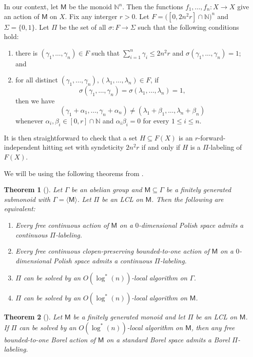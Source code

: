\documentclass[11pt, reqno, a4paper]{amsart}
\newtheorem{theorem}{Theorem}[section]
\theoremstyle{definition}
\theoremstyle{plain}
\begin{document}
In our context, let $\mathsf{M}$ be the monoid $\mathbb{N}^n$. Then the functions $f_1, \dots, f_n\colon X\to X$ give an action of $\mathsf{M}$ on $X$. Fix any interger $r>0$. Let $F=\big([0,2n^2r]\cap \mathbb{N}\big)^n$ and $\Sigma=\{0,1\}$. Let $\Pi$ be the set of all $\sigma\colon F\to \Sigma$ such that the following conditions hold:
\begin{enumerate}
\item[(i)] there is $(\gamma_1, \dots, \gamma_n)\in F$ such that $\sum_{i=1}^n\gamma_i\leq 2n^2r$ and $\sigma(\gamma_1,\dots, \gamma_n)=1$; and
\item[(ii)] for all distinct $(\gamma_1, \dots, \gamma_n), (\lambda_1, \dots, \lambda_n)\in F$, if 
$$ \sigma(\gamma_1,\dots, \gamma_n)=\sigma(\lambda_1,\dots,\lambda_n)=1, $$
then we have
$$ (\gamma_1+\alpha_1, \dots, \gamma_n+\alpha_n)\neq (\lambda_1+\beta_1,\dots, \lambda_n+\beta_n) $$
whenever $\alpha_i, \beta_i\in [0,r]\cap \mathbb{N}$ and $\alpha_i\beta_i=0$ for every $1\leq i\leq n$.
\end{enumerate}
It is then straightforward to check that a set $H\subseteq F(X)$ is an $r$-forward-independent hitting set with syndeticity $2n^2r$ if and only if $H$ is a $\Pi$-labeling of $F(X)$.

We will be using the following theorems from \cite{NaryshkinShinkoWeilacherYuCommutingFunctions}.

\begin{theorem}[{\cite[Theorem 1.7]{NaryshkinShinkoWeilacherYuCommutingFunctions}}]\label{thm:3.2} Let $\Gamma$ be an abelian group and $\mathsf{M}\subseteq \Gamma$ be a finitely generated submonoid with $\Gamma=\langle \mathsf{M}\rangle$.  Let $\Pi$ be an LCL on $\mathsf{M}$. Then the following are equivalent:
\begin{enumerate}
\item Every free continuous action of $\mathsf{M}$ on a $0$-dimensional Polish space admits a continuous $\Pi$-labeling.
\item Every free continuous clopen-preserving bounded-to-one action of $\mathsf{M}$ on a $0$-dimensional Polish space admits a continuous $\Pi$-labeling.
\item $\Pi$ can be solved by an $O(\log^*(n))$-local algorithm on $\Gamma$.
\item $\Pi$ can be solved by an $O(\log^*(n))$-local algorithm on $\mathsf{M}$.
\end{enumerate}
\end{theorem}

\begin{theorem}[{\cite[Proposition 3.22]{NaryshkinShinkoWeilacherYuCommutingFunctions}}]\label{thm:3.3} Let $\mathsf{M}$ be a finitely generated monoid and let $\Pi$ be an LCL on $\mathsf{M}$. If $\Pi$ can be solved by an $O(\log^*(n))$-local algorithm on $\mathsf{M}$, then any free bounded-to-one Borel action of $\mathsf{M}$ on a standard Borel space admits a Borel $\Pi$-labeling.
\end{theorem}
\end{document}
